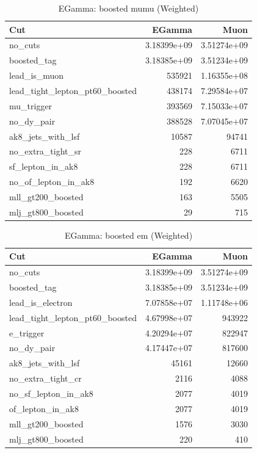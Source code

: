 \documentclass{article}
\begin{document}
\begin{table}[htbp]
\centering
\caption{EGamma: boosted mumu (Weighted)}
\begin{tabular}{lrr}
\hline
Cut & EGamma & Muon \\
\hline
no\_cuts & 3.18399e+09 & 3.51274e+09 \\
boosted\_tag & 3.18385e+09 & 3.51234e+09 \\
lead\_is\_muon & 535921 & 1.16355e+08 \\
lead\_tight\_lepton\_pt60\_boosted & 438174 & 7.29584e+07 \\
mu\_trigger & 393569 & 7.15033e+07 \\
no\_dy\_pair & 388528 & 7.07045e+07 \\
ak8\_jets\_with\_lsf & 10587 & 94741 \\
no\_extra\_tight\_sr & 228 & 6711 \\
sf\_lepton\_in\_ak8 & 228 & 6711 \\
no\_of\_lepton\_in\_ak8 & 192 & 6620 \\
mll\_gt200\_boosted & 163 & 5505 \\
mlj\_gt800\_boosted & 29 & 715 \\
\hline
\end{tabular}
\end{table}

\begin{table}[htbp]
\centering
\caption{EGamma: boosted em (Weighted)}
\begin{tabular}{lrr}
\hline
Cut & EGamma & Muon \\
\hline
no\_cuts & 3.18399e+09 & 3.51274e+09 \\
boosted\_tag & 3.18385e+09 & 3.51234e+09 \\
lead\_is\_electron & 7.07858e+07 & 1.11748e+06 \\
lead\_tight\_lepton\_pt60\_boosted & 4.67998e+07 & 943922 \\
e\_trigger & 4.20294e+07 & 822947 \\
no\_dy\_pair & 4.17447e+07 & 817600 \\
ak8\_jets\_with\_lsf & 45161 & 12660 \\
no\_extra\_tight\_cr & 2116 & 4088 \\
no\_sf\_lepton\_in\_ak8 & 2077 & 4019 \\
of\_lepton\_in\_ak8 & 2077 & 4019 \\
mll\_gt200\_boosted & 1576 & 3030 \\
mlj\_gt800\_boosted & 220 & 410 \\
\hline
\end{tabular}
\end{table}
\end{document}
